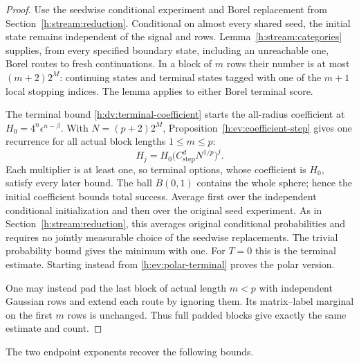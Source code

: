 \begin{proof}
Use the seedwise conditional experiment and Borel replacement from
Section~\ref{h:stream:reduction}. Conditional on almost every shared
seed, the initial state remains independent of the signal and rows.
Lemma~\ref{h:stream:categories} supplies, from every specified boundary
state, including an unreachable one, Borel routes to fresh
continuations. In a block of \(m\) rows their number is at most
\((m+2)2^M\): continuing states and terminal states tagged with one
of the \(m+1\) local stopping indices. The lemma applies to either
Borel terminal score.

The terminal bound \eqref{h:dv:terminal-coefficient} starts the
all-radius coefficient at \(H_0=4^n\epsilon^{n-\beta}\).
With \(N=(p+2)2^M\), Proposition~\ref{h:ev:coefficient-step} gives
one recurrence for all actual block lengths \(1\le m\le p\):
\begin{equation}\label{h:ev:coefficient-recursion}
 H_j=H_0\bigl(C_{\mathrm{step}}^dN^{1/p}\bigr)^j.
\end{equation}
Each multiplier is at least one, so terminal options, whose coefficient
is \(H_0\), satisfy every later bound. The ball \(B(0,1)\) contains
the whole sphere; hence the initial coefficient bounds total success.
Average first over the independent conditional initialization and then
over the original seed experiment. As in
Section~\ref{h:stream:reduction}, this averages original conditional
probabilities and requires no jointly measurable choice of the
seedwise replacements. The trivial probability bound gives the minimum
with one. For \(T=0\) this is the terminal estimate. Starting instead
from \eqref{h:ev:polar-terminal} proves the polar version.

One may instead pad the last block of actual length \(m<p\) with
independent Gaussian rows and extend each route by ignoring them.
Its matrix--label marginal on the first \(m\) rows is unchanged.
Thus full padded blocks give exactly the same estimate and count.
\end{proof}

The two endpoint exponents recover the following bounds.

